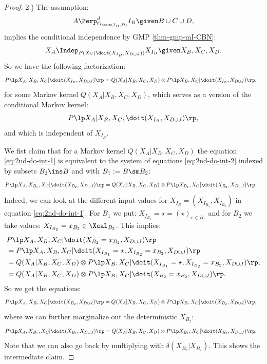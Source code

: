 \begin{Cor}[Do-calculus]
\begin{proof}
2.) The assumption:
            \[ A \Perp^d_{G_{\doit(I_B,D)}} I_B \given B \cup C \cup D,   \]
implies the conditional independence by GMP \ref{thm-gmp-mI-CBN}:
  \[ X_A \Indep_{P(X_V|\doit(X_{I_B},X_{D\cup J}))} X_{I_B} \given X_B,X_C,X_D.\]
So we have the following factorization:
\begin{align}
    P\lp X_A,X_B,X_C|\doit(X_{I_B},X_{D\cup J})\rp &= Q(X_A|X_B,X_C,X_D) \otimes P\lp X_B,X_C|\doit(X_{I_B},X_{D\cup J})\rp,\label{eq:2nd-do-int-1}  
\end{align}
for some Markov kernel $Q(X_A|X_B,X_C,X_D)$, which serves as a version of the conditional Markov kernel:
  \[P\lp X_A|X_B,X_C,\doit(X_{I_B},X_{D\cup J})\rp,\]
and which is independent of $X_{I_B}$.

We fist claim that for a Markov kernel $Q(X_A|X_B,X_C,X_D)$ the equation \ref{eq:2nd-do-int-1} is equivalent to the system of equations \ref{eq:2nd-do-int-2} indexed by subsets $B_2 \ins B$ and with $B_1 := B \sm B_2$:
\begin{align}
    P\lp X_A,X_{B_1},X_C|\doit(X_{B_2},X_{D\cup J})\rp &= Q(X_A|X_B,X_C,X_D) \otimes P\lp X_{B_1},X_C|\doit(X_{B_2},X_{D\cup J})\rp. \label{eq:2nd-do-int-2} 
\end{align}
Indeed, we can look at the different input values for
$X_{I_{B}} = (X_{I_{B_1}},X_{I_{B_2}})$ in equation \ref{eq:2nd-do-int-1}.
For $B_1$ we put: $X_{I_{B_1}}= \star = (\star)_{v \in B_1}$ and for $B_2$ we take values: 
$X_{I_{B_2}}=x_{B_2} \in \Xcal_{B_2}$.
This implies: 
\begin{align*} 
  & P\lp X_A,X_B,X_C|\doit(X_{{B_2}}=x_{B_2},X_{D\cup J})\rp \\
  &= P\lp X_A,X_B,X_C|\doit(X_{I_{B_1}}=\star,X_{I_{B_2}}=x_{B_2},X_{D\cup J})\rp \\
  &= Q(X_A|X_B,X_C,X_D) \otimes P\lp X_B,X_C|\doit(X_{I_{B_1}}=\star,X_{I_{B_2}}=x_{B_2},X_{D\cup J})\rp,\\
  &= Q(X_A|X_B,X_C,X_D) \otimes P\lp X_B,X_C|\doit(X_{{B_2}}=x_{B_2},X_{D\cup J})\rp.
\end{align*}
So we get the equations:
\begin{align*}
    P\lp X_A,X_B,X_C|\doit(X_{B_2},X_{D\cup J})\rp 
  &= Q(X_A|X_B,X_C,X_D) \otimes P\lp X_B,X_C|\doit(X_{B_2},X_{D\cup J})\rp, 
\end{align*}
  where we can further marginalize out the deterministic $X_{B_2}$:
  \begin{align*} P\lp X_A,X_{B_1},X_C|\doit(X_{B_2},X_{D\cup J})\rp 
  &= Q(X_A|X_B,X_C,X_D) \otimes P\lp X_{B_1},X_C|\doit(X_{B_2},X_{D\cup J})\rp. %
  \end{align*}
  Note  that we can also go back by multiplying with $\delta(X_{B_2}|X_{B_2})$. This shows the intermediate claim.


\end{proof}
\end{Cor}
